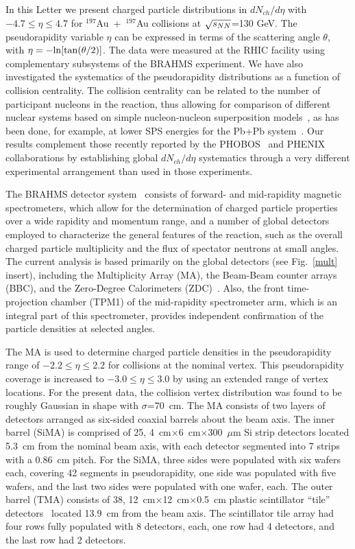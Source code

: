 \documentclass[singlespacing]{elsart}
\begin{document}
In this Letter we present charged particle distributions
in $dN_{ch}/d\eta$ with $-4.7 \le \eta \le 4.7$ for $^{197}$Au~+~$^{197}$Au
collisions at $\sqrt{s_{\small{NN}}}$=130 GeV.  The pseudorapidity
variable $\eta$ can be expressed in terms of the scattering angle
$\theta$, with
$\eta=-{\rm ln}[{\rm tan}(\theta/2)]$.
The data were measured at the RHIC facility 
using complementary subsystems of the  BRAHMS experiment.
We have also investigated the systematics of 
the pseudorapidity  distributions as a function of collision  
centrality. The collision centrality can be related 
to the number of participant nucleons in the reaction, thus
allowing for comparison of different nuclear systems based on
simple nucleon-nucleon superposition models~\cite{bialas76}, 
as has been done, for example, at lower SPS energies for the 
Pb+Pb system~\cite{deines00,aggarwal01}. Our results
complement those recently reported by the PHOBOS~\cite{back00,back01} 
and PHENIX~\cite{adcox01} collaborations by establishing global
$dN_{ch}/d\eta$ systematics through a very different 
experimental arrangement than used in those experiments.

The BRAHMS detector system~\cite{BRAHMSNIM} consists of forward- and 
mid-rapidity
magnetic spectrometers, 
which allow for the determination of charged particle 
properties over a wide rapidity and momentum range, and
a number of global detectors employed to characterize the 
general features of the reaction, such as the overall charged 
particle multiplicity and the flux of spectator neutrons at
small angles.  
The current analysis is based primarily on the global detectors 
(see Fig.~\ref{mult} insert),
including the Multiplicity Array (MA), the Beam-Beam counter arrays
(BBC), and the Zero-Degree Calorimeters (ZDC)~\cite{adler00}.   
Also, the front time-projection chamber (TPM1) of
the mid-rapidity spectrometer arm, which is an integral part of this
spectrometer, provides independent confirmation of the
particle densities at selected angles. 

The MA is used to determine  charged
particle densities in the pseudorapidity range of
$-2.2\le\eta\le2.2$ for collisions at the nominal vertex. 
This pseudorapidity coverage is increased to $-3.0\le\eta\le3.0$ 
by using an extended range of vertex locations. For the present data, 
the collision vertex distribution was
found to be roughly Gaussian in shape with $\sigma$=70~cm.  
The MA consists of two layers of
detectors arranged as  six-sided coaxial barrels about the beam axis.
The inner barrel (SiMA) is comprised of 
25, 4~cm$\times$6~cm$\times$300~$\mu$m Si 
strip detectors  located 5.3~cm
from the nominal beam axis, with each detector 
segmented into 7 strips with a 0.86~cm pitch. 
For the SiMA, three sides were populated with six wafers each, 
covering 42 segments in
pseudorapidity, one side was populated with five wafers, 
and the last two sides were populated with one wafer, each. 
The outer barrel (TMA)  
consists of 38, 12~cm$\times$12~cm$\times$0.5~cm
plastic scintillator ``tile'' detectors~\cite{aota95} located 13.9~cm from 
the beam axis. The scintillator tile array had four rows fully populated
with 8 detectors, each, one row had 4 detectors, and the last row had 2
detectors.    
\end{document}

